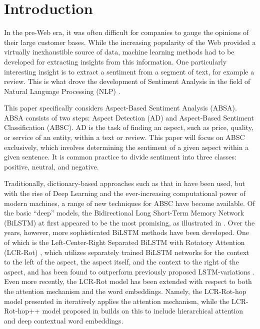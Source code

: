 \section{Introduction}




In the pre-Web era, it was often difficult for companies to gauge the opinions of their large customer bases. While the increasing popularity of the Web provided a virtually inexhaustible source of data, machine learning methods had to be developed for extracting insights from this information. One particularly interesting insight is to extract a sentiment from a segment of text, for example a review. This is what drove the development of Sentiment Analysis in the field of Natural Language Processing (NLP) \cite{Liu2020}. 

This paper specifically considers Aspect-Based Sentiment Analysis (ABSA). ABSA consists of two steps: Aspect Detection (AD) and Aspect-Based Sentiment Classification (ABSC). AD is the task of finding an aspect, such as price, quality, or service of an entity, within a text or review. This paper will focus on ABSC exclusively, which involves determining the sentiment of a given aspect within a given sentence\cite{brauwers2021, Schouten2017}. It is common practice to divide sentiment into three classes: positive, neutral, and negative.

Traditionally, dictionary-based approaches such as that in \cite{Hu2004} have been used, but with the rise of Deep Learning and the ever-increasing computational power of modern machines, a range of new techniques for ABSC have become available. Of the basic ``deep'' models, the Bidirectional Long Short-Term Memory Network (BiLSTM) at first appeared to be the most promising, as illustrated in \cite{Graves2005}. Over the years, however, more sophisticated BiLSTM methods have been developed. One of which is the Left-Center-Right Separated BiLSTM with Rotatory Attention (LCR-Rot) \cite{Zheng2018}, which utilizes separately trained BiLSTM networks for the context to the left of the aspect, the aspect itself, and the context to the right of the aspect, and has been found to outperform previously proposed LSTM-variations \cite{Zheng2018}. Even more recently, the LCR-Rot model has been extended with respect to both the attention mechanism and the word embeddings. Namely, the LCR-Rot-hop model presented in \cite{Wallaart2019} iteratively applies the attention mechanism, while the LCR-Rot-hop++ model proposed in \cite{Trusca2020} builds on this to include hierarchical attention and deep contextual word embeddings. 


